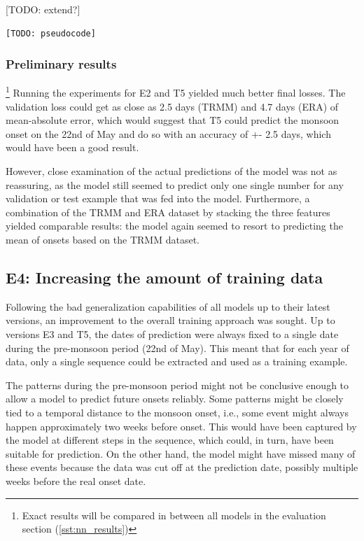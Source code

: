 [TODO: extend?]

\begin{figure}[h]
\end{figure}

\begin{lstlisting}[language=Python]
  [TODO: pseudocode]
\end{lstlisting}

\subsubsection{Preliminary results}{\footnote{Exact results will be compared in between all models in the evaluation section (\cref{sst:nn_results})}}
\label{ssst:nn_e2t5_results}
Running the experiments for E2 and T5 yielded much better final losses. The validation loss could get as close as 2.5 days (TRMM) and 4.7 days (ERA) of mean-absolute error, which would suggest that T5 could predict the monsoon onset on the 22nd of May and do so with an accuracy of +- 2.5 days, which would have been a good result.

However, close examination of the actual predictions of the model was not as reassuring, as the model still seemed to predict only one single number for any validation or test example that was fed into the model. Furthermore, a combination of the TRMM and ERA dataset by stacking the three features yielded comparable results: the model again seemed to resort to predicting the mean of onsets based on the TRMM dataset.


\subsection{E4: Increasing the amount of training data}
\label{sst:nn_e4}
Following the bad generalization capabilities of all models up to their latest versions, an improvement to the overall training approach was sought. Up to versions E3 and T5, the dates of prediction were always fixed to a single date during the pre-monsoon period (22nd of May). This meant that for each year of data, only a single sequence could be extracted and used as a training example.

The patterns during the pre-monsoon period might not be conclusive enough to allow a model to predict future onsets reliably. Some patterns might be closely tied to a temporal distance to the monsoon onset, i.e., some event might always happen approximately two weeks before onset. This would have been captured by the model at different steps in the sequence, which could, in turn, have been suitable for prediction. On the other hand, the model might have missed many of these events because the data was cut off at the prediction date, possibly multiple weeks before the real onset date.


